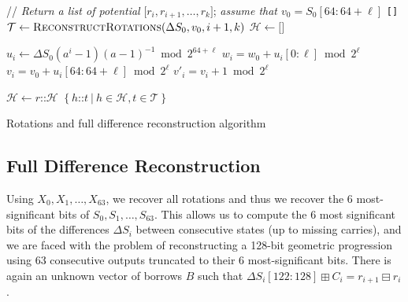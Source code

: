\documentclass[journal=tosc,final]{iacrtrans}
\begin{document}
\begin{algorithm}
\begin{algorithmic}[1]
 \State // \emph{Return a list of potential} $\texttt{[}r_i, r_{i+1}, \dots, r_k\texttt{]}$; \emph{assume that $v_0 = S_0[64:64+\ell]$}
  \State \Return \texttt{[]} 
  \EndIf
  \State $\mathcal{T} \gets \Call{ReconstructRotations}{\Delta S_0, v_0, i + 1, k}$ 
  \State $\mathcal{H} \gets \texttt{[]}$ 

  \State $u_i \gets \Delta S_0 (a^i-1)(a-1)^{-1} \bmod 2^{64+\ell}$ 
  \State $w_i = w_0 + u_i[0:\ell] \bmod 2^{\ell}$ 
  \State $v_i = v_0 + u_i[64:64+\ell] \bmod 2^{\ell}$ 
  \State $v'_i = v_i + 1 \bmod 2^{\ell}$

   
   
  \State $\mathcal{H} \gets r \texttt{::} \mathcal{H}$ 
  \EndIf
  \EndFor
  \State \Return $\left\{ h\texttt{::} t~|~ h \in \mathcal{H}, t \in \mathcal{T} \right\}$ 
  \EndFunction
\end{algorithmic}
\caption{Rotations and full difference reconstruction algorithm}
\label{algo:unknown_2}
\end{algorithm}


\subsection{Full Difference Reconstruction}
\label{sec:big_cvp}

Using $X_0, X_1, \dots, X_{63}$, we recover all rotations and thus we recover
the 6 most-significant bits of $S_0, S_1, \dots, S_{63}$. This allows us to
compute the 6 most significant bits of the differences $\Delta S_i$ between
consecutive states (up to missing carries), and we are faced with the problem of
reconstructing a 128-bit geometric progression using 63 consecutive outputs
truncated to their 6 most-significant bits. There is again an unknown vector of
borrows $B$ such that $\Delta S_i[122:128] \boxplus C_i= r_{i+1} \boxminus r_i$.
\end{document}
